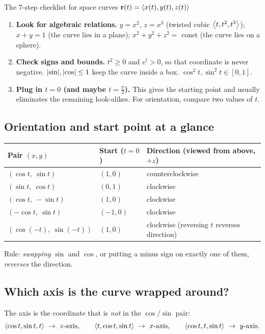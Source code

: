 \begin{keybox}{The 7-step checklist for space curves $\mathbf{r}(t)=\left\langle x(t),y(t),z(t) \right\rangle$}
\begin{enumerate}
\item \textbf{Look for algebraic relations.} $y=x^2$, $z=x^3$ (twisted cubic $\left\langle t,t^2,t^3 \right\rangle$);
  $x+y=1$ (the curve lies in a plane); $x^2+y^2+z^2=$ const (the curve lies on a sphere).
\item \textbf{Check signs and bounds.} $t^2\ge0$ and $e^t>0$, so that coordinate is never
  negative. $\lvert\sin\rvert,\lvert\cos\rvert\le1$ keep the curve inside a box. $\cos^2t,\sin^2t\in[0,1]$.
\item \textbf{Plug in $t=0$ (and maybe $t=\frac\pi2$).} This gives the starting point and
  usually eliminates the remaining look-alikes. For orientation, compare two values of $t$.
\end{enumerate}
\end{keybox}

\subsection*{Orientation and start point at a glance}

\begin{center}
\renewcommand{\arraystretch}{1.35}
\begin{tabular}{lll}
\toprule
\textbf{Pair $(x,y)$} & \textbf{Start ($t=0$)} & \textbf{Direction (viewed from above, $+z$)}\\
\midrule
$(\cos t,\ \sin t)$ & $(1,0)$ & counterclockwise\\
$(\sin t,\ \cos t)$ & $(0,1)$ & clockwise\\
$(\cos t,\ -\sin t)$ & $(1,0)$ & clockwise\\
$(-\cos t,\ \sin t)$ & $(-1,0)$ & clockwise\\
$(\cos(-t),\ \sin(-t))$ & $(1,0)$ & clockwise (reversing $t$ reverses direction)\\
\bottomrule
\end{tabular}
\end{center}

Rule: \emph{swapping} $\sin$ and $\cos$, or putting a minus sign on exactly one of them,
\emph{reverses} the direction.

\subsection*{Which axis is the curve wrapped around?}

The axis is the coordinate that is \emph{not} in the $\cos/\sin$ pair:
\[
\ip{\cos t,\sin t,t}\ \to\ z\text{-axis},\qquad
\ip{t,\cos t,\sin t}\ \to\ x\text{-axis},\qquad
\ip{\cos t,t,\sin t}\ \to\ y\text{-axis}.
\]

